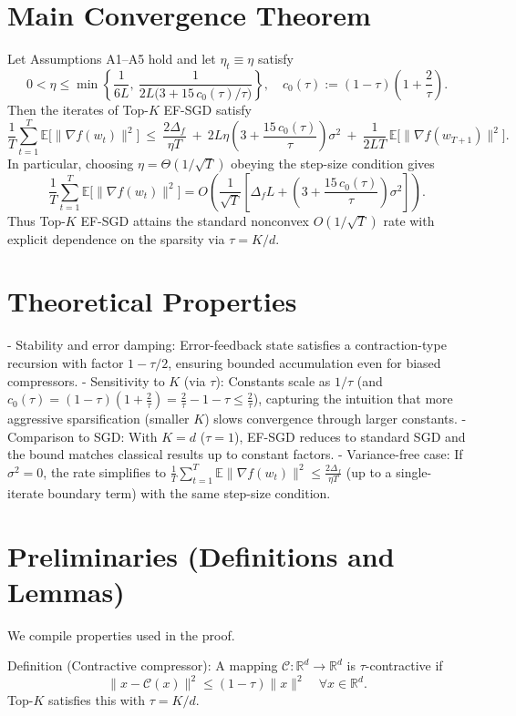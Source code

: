 \documentclass[11pt]{article}
\newcommand{\E}{\mathbb{E}}
\newcommand{\R}{\mathbb{R}}
\begin{document}
\section*{Main Convergence Theorem}
Let Assumptions A1--A5 hold and let $\eta_t \equiv \eta$ satisfy
\[
0 < \eta \le \min\left\{ \frac{1}{6L},\ \frac{1}{2L\bigl(3 + 15\, c_0(\tau)/\tau\bigr)}\right\},\quad
c_0(\tau) := (1-\tau)\left(1 + \frac{2}{\tau}\right).
\]
Then the iterates of Top-$K$ EF-SGD satisfy
\[
\frac{1}{T}\sum_{t=1}^T \E\bigl[\|\nabla f(w_t)\|^2\bigr]
\ \le\ 
\frac{2\Delta_f}{\eta T}
\ +\ 2L\eta \left(3 + \frac{15\,c_0(\tau)}{\tau}\right)\sigma^2
\ +\ \frac{1}{2LT}\,\E\bigl[\|\nabla f(w_{T+1})\|^2\bigr].
\]
In particular, choosing $\eta = \Theta(1/\sqrt{T})$ obeying the step-size condition gives
\[
\frac{1}{T}\sum_{t=1}^T \E\bigl[\|\nabla f(w_t)\|^2\bigr]
= O\!\left(\frac{1}{\sqrt{T}}\left[\Delta_f L + \left(3 + \frac{15\,c_0(\tau)}{\tau}\right)\sigma^2\right]\right).
\]
Thus Top-$K$ EF-SGD attains the standard nonconvex $O(1/\sqrt{T})$ rate with explicit dependence on the sparsity via $\tau = K/d$.

\section*{Theoretical Properties}
- Stability and error damping: Error-feedback state satisfies a contraction-type recursion with factor $1-\tau/2$, ensuring bounded accumulation even for biased compressors.
- Sensitivity to $K$ (via $\tau$): Constants scale as $1/\tau$ (and $c_0(\tau)= (1-\tau)\left(1+\frac{2}{\tau}\right) = \frac{2}{\tau} - 1 - \tau \le \frac{2}{\tau}$), capturing the intuition that more aggressive sparsification (smaller $K$) slows convergence through larger constants.
- Comparison to SGD: With $K=d$ ($\tau=1$), EF-SGD reduces to standard SGD and the bound matches classical results up to constant factors.
- Variance-free case: If $\sigma^2=0$, the rate simplifies to $\frac{1}{T}\sum_{t=1}^T \E\|\nabla f(w_t)\|^2 \le \frac{2\Delta_f}{\eta T}$ (up to a single-iterate boundary term) with the same step-size condition.

\section*{Preliminaries (Definitions and Lemmas)}
We compile properties used in the proof.

\noindent
Definition (Contractive compressor):
A mapping $\mathcal{C}:\R^d \to \R^d$ is $\tau$-contractive if
\[
\|x - \mathcal{C}(x)\|^2 \le (1-\tau)\|x\|^2\quad \forall x \in \R^d.
\]
Top-$K$ satisfies this with $\tau = K/d$.
\end{document}
